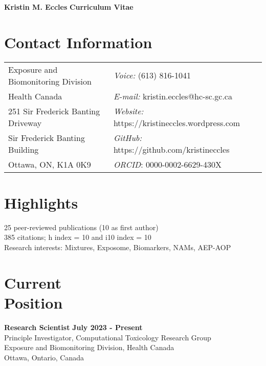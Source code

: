 \documentclass[margin,line]{res}
\begin{document}
\begin{flushleft}
		\huge \textbf{Kristin M. Eccles}
		\hfill {\LARGE \textbf{Curriculum Vitae}}\\
\end{flushleft}

\begin{resume}

\section{\sc Contact Information}
\vspace{.05in}
\begin{tabular}{@{}p{3.2in}p{2.5in}}
Exposure and Biomonitoring Division & {\it Voice:}  (613) 816-1041 \\
Health Canada & {\it E-mail:}  kristin.eccles@hc-sc.gc.ca\\
251 Sir Frederick Banting Driveway&{\it Website:} https://kristineccles.wordpress.com  \\
Sir Frederick Banting Building&{\it GitHub:} https://github.com/kristineccles \\
Ottawa, ON, K1A 0K9 & {\it ORCID}: 0000-0002-6629-430X

\end{tabular}

\vspace*{.1in}
\section{\sc Highlights}
25 peer-reviewed publications (10 as first author)
\\
385 citations; h index = 10 and i10 index = 10
\\
Research interests: Mixtures, Exposome, Biomarkers, NAMs, AEP-AOP

\vspace*{.1in}
\section{\sc Current\\Position}
{\bf  Research Scientist} \hfill {\bf July 2023 - Present}\\
Principle Investigator, Computational Toxicology Research Group\\
Exposure and Biomonitoring Division, Health Canada\\
Ottawa, Ontario, Canada

\vspace*{.1in}

\end{resume}
\end{document}
